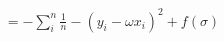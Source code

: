\documentclass[preview]{standalone}
\begin{document}
\begin{align*}
=  -\sum_i^n \frac{1}{n} -(y_i- \omega x_i)^2 +f(\sigma)
\end{align*}
\end{document}
